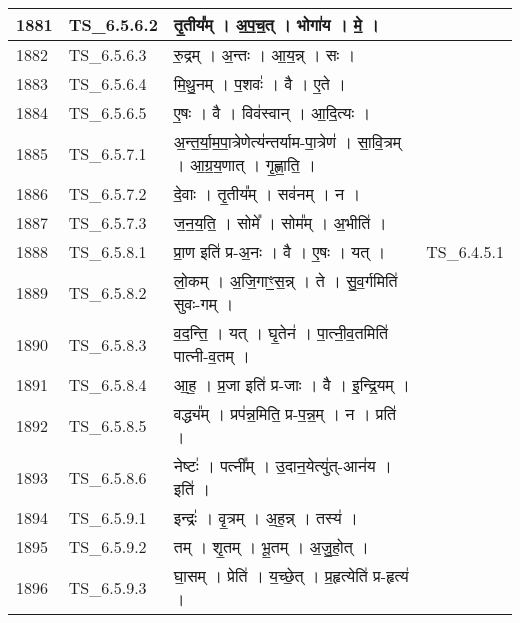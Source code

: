 \documentclass[17pt]{extarticle}
\begin{document}
\begin{longtable}{||p{0.4in}||p{0.9in}||p{4.0in}||p{0.9in}||}
        \hline
            1881 & TS\_6.5.6.2 & तृ॒तीय᳚म्   ।   अ॒प॒च॒त्   ।   भोगा॑य   ।   मे॒   ।    &      \\
        \hline
            1882 & TS\_6.5.6.3 & रु॒द्रम्   ।   अ॒न्तः   ।   आ॒य॒न्न्   ।   सः   ।    &      \\
        \hline
            1883 & TS\_6.5.6.4 & मि॒थु॒नम्   ।   प॒शवः॑   ।   वै   ।   ए॒ते   ।    &      \\
        \hline
            1884 & TS\_6.5.6.5 & ए॒षः   ।   वै   ।   विव॑स्वान्   ।   आ॒दि॒त्यः   ।    &      \\
        \hline
            1885 & TS\_6.5.7.1 & अ॒न्त॒र्या॒म॒पा॒त्रेणेत्य॑न्तर्याम{-}पा॒त्रेण॑   ।   सा॒वि॒त्रम्   ।   आ॒ग्र॒य॒णात्   ।   गृ॒ह्णा॒ति॒   ।    &      \\
        \hline
            1886 & TS\_6.5.7.2 & दे॒वाः   ।   तृ॒तीय᳚म्   ।   सव॑नम्   ।   न   ।    &      \\
        \hline
            1887 & TS\_6.5.7.3 & ज॒न॒य॒ति॒   ।   सोमे᳚   ।   सोम᳚म्   ।   अ॒भीति॑   ।    &      \\
        \hline
            1888 & TS\_6.5.8.1 & प्रा॒ण इति॑ प्र{-}अ॒नः   ।   वै   ।   ए॒षः   ।   यत्   ।    & TS\_6.4.5.1        \\
        \hline
            1889 & TS\_6.5.8.2 & लो॒कम्   ।   अ॒जि॒गाꣳ॒॒स॒न्न्   ।   ते   ।   सु॒व॒र्गमिति॑ सुवः{-}गम्   ।    &      \\
        \hline
            1890 & TS\_6.5.8.3 & व॒द॒न्ति॒   ।   यत्   ।   घृ॒तेन॑   ।   पा॒त्नी॒व॒तमिति॑ पात्नी{-}व॒तम्   ।    &      \\
        \hline
            1891 & TS\_6.5.8.4 & आ॒ह॒   ।   प्र॒जा इति॑ प्र{-}जाः   ।   वै   ।   इ॒न्द्रि॒यम्   ।    &      \\
        \hline
            1892 & TS\_6.5.8.5 & वद्ध्य᳚म्   ।   प्रप॑न्न॒मिति॒ प्र{-}प॒न्न॒म्   ।   न   ।   प्रति॑   ।    &      \\
        \hline
            1893 & TS\_6.5.8.6 & नेष्टः॑   ।   पत्नी᳚म्   ।   उ॒दान॒येत्यु॑त्{-}आन॑य   ।   इति॑   ।    &      \\
        \hline
            1894 & TS\_6.5.9.1 & इन्द्रः॑   ।   वृ॒त्रम्   ।   अ॒ह॒न्न्   ।   तस्य॑   ।    &      \\
        \hline
            1895 & TS\_6.5.9.2 & तम्   ।   शृ॒तम्   ।   भू॒तम्   ।   अ॒जु॒हो॒त्   ।    &      \\
        \hline
            1896 & TS\_6.5.9.3 & घा॒सम्   ।   प्रेति॑   ।   य॒च्छे॒त्   ।   प्र॒हृत्येति॑ प्र{-}हृत्य॑   ।    &      \\

\end{longtable}
\end{document}

